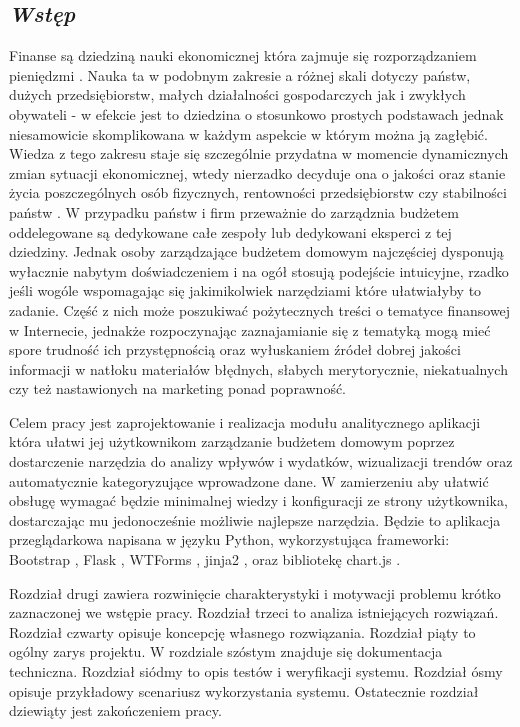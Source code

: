 \documentclass[a4paper,10pt, twoside]{report}
\newcommand{\customstylechapter}[1]{\large{\textit{#1}}}
\begin{document}
\begin{large}
\chapter{\customstylechapter{Wstęp}}
{Finanse są dziedziną nauki ekonomicznej która zajmuje się rozporządzaniem 
pieniędzmi  \cite{wiki_ekonomia}. Nauka ta w podobnym zakresie a różnej skali 
dotyczy państw, dużych przedsiębiorstw, małych działalności gospodarczych jak i 
zwykłych obywateli - w efekcie jest to dziedzina o stosunkowo prostych 
podstawach jednak niesamowicie skomplikowana w każdym aspekcie w którym można ją
 zagłębić. Wiedza z tego zakresu staje się szczególnie przydatna w momencie 
dynamicznych zmian sytuacji ekonomicznej, wtedy nierzadko decyduje ona o jakości
 oraz stanie życia poszczególnych osób fizycznych, rentowności przedsiębiorstw 
czy stabilności państw \cite{zapaśćekonomiczna}. W przypadku państw i firm 
przeważnie do zarządznia budżetem oddelegowane są dedykowane całe zespoły lub 
dedykowani eksperci z tej dziedziny. Jednak osoby zarządzające budżetem domowym 
najczęściej dysponują wyłacznie nabytym doświadczeniem i na ogół stosują 
podejście intuicyjne, rzadko jeśli wogóle wspomagając się jakimikolwiek 
narzędziami które ułatwiałyby to zadanie. Część z nich może poszukiwać 
pożytecznych treści o tematyce finansowej w Internecie, jednakże rozpoczynając 
zaznajamianie się z tematyką mogą mieć spore trudność ich przystępnością oraz 
wyłuskaniem źródeł dobrej jakości informacji w natłoku materiałów błędnych, 
słabych merytorycznie, niekatualnych czy też nastawionych na marketing ponad 
poprawność.}

\medskip
{Celem pracy jest zaprojektowanie i realizacja modułu analitycznego aplikacji 
która ułatwi jej użytkownikom zarządzanie budżetem domowym poprzez dostarczenie 
narzędzia do analizy wpływów i wydatków, wizualizacji trendów oraz automatycznie 
kategoryzujące wprowadzone dane. W zamierzeniu aby ułatwić obsługę wymagać 
będzie minimalnej wiedzy i konfiguracji ze strony użytkownika, dostarczając mu 
jedonocześnie możliwie najlepsze narzędzia. Będzie to aplikacja przeglądarkowa napisana w 
języku Python, wykorzystująca frameworki: Bootstrap \cite{Bootstrap}, 
Flask \cite{Flask}, WTForms \cite{WTForms}, jinja2 \cite{jinja}, oraz bibliotekę 
chart.js \cite{chart.js}.}

\medskip
{Rozdział drugi zawiera rozwinięcie charakterystyki i motywacji problemu krótko 
zaznaczonej we wstępie pracy. Rozdział trzeci to analiza istniejących rozwiązań.
 Rozdział czwarty opisuje koncepcję własnego rozwiązania. Rozdział piąty to 
ogólny zarys projektu. W rozdziale szóstym znajduje się dokumentacja techniczna.
Rozdział siódmy to opis testów i weryfikacji systemu. Rozdział ósmy opisuje 
przykładowy scenariusz wykorzystania systemu. Ostatecznie rozdział dziewiąty 
jest zakończeniem pracy.}


\end{large}
\end{document}
